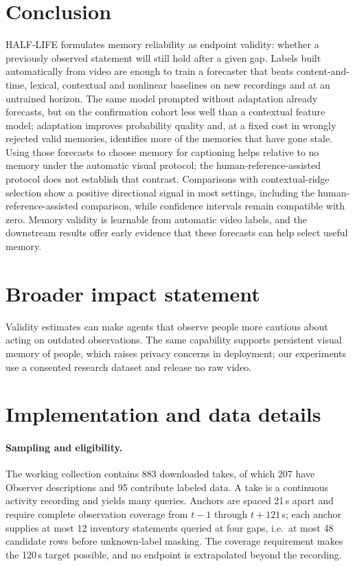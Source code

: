 \documentclass[10pt]{article}
\begin{document}
\section{Conclusion}
HALF-LIFE formulates memory reliability as endpoint validity: whether a previously observed statement will still hold after a given gap. Labels built automatically from video are enough to train a forecaster that beats content-and-time, lexical, contextual and nonlinear baselines on new recordings and at an untrained horizon. The same model prompted without adaptation already forecasts, but on the confirmation cohort less well than a contextual feature model; adaptation improves probability quality and, at a fixed cost in wrongly rejected valid memories, identifies more of the memories that have gone stale. Using those forecasts to choose memory for captioning helps relative to no memory under the automatic visual protocol; the human-reference-assisted protocol does not establish that contrast. Comparisons with contextual-ridge selection show a positive directional signal in most settings, including the human-reference-assisted comparison, while confidence intervals remain compatible with zero. Memory validity is learnable from automatic video labels, and the downstream results offer early evidence that these forecasts can help select useful memory.

\section*{Broader impact statement}
Validity estimates can make agents that observe people more cautious about acting on outdated observations. The same capability supports persistent visual memory of people, which raises privacy concerns in deployment; our experiments use a consented research dataset and release no raw video.




\clearpage
\appendix

\section{Implementation and data details}
\label{app:impl}

\paragraph{Sampling and eligibility.} The working collection contains 883 downloaded takes, of which 207 have Observer descriptions and 95 contribute labeled data. A take is a continuous activity recording and yields many queries. Anchors are spaced 21\,s apart and require complete observation coverage from $t-1$ through $t+121$\,s; each anchor supplies at most 12 inventory statements queried at four gaps, i.e.\ at most 48 candidate rows before unknown-label masking. The coverage requirement makes the 120\,s target possible, and no endpoint is extrapolated beyond the recording.
\end{document}
